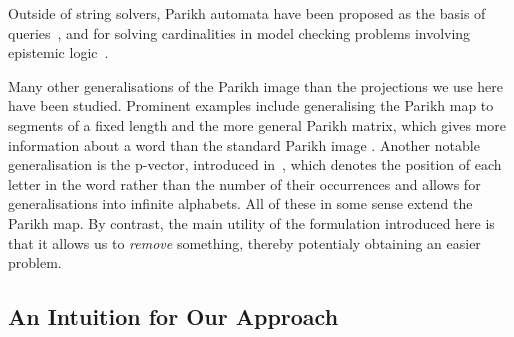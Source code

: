 Outside of string solvers, Parikh automata have been proposed as the basis of
queries~\cite{graph-queries}, and for solving cardinalities in model checking
problems involving epistemic logic~\cite{epistemic-logic}.

Many other generalisations of the Parikh image than the projections we use here have been
studied. Prominent examples include generalising the Parikh map to segments of a
fixed length \cite{KARHUMAKI1980155} and the more general Parikh matrix, which
gives more information about a word than the standard Parikh image
\cite{parikh-matrix}. Another notable generalisation is the p-vector, introduced
in~\cite{infinite-words}, which denotes the position of each letter in the word
rather than the number of their occurrences and allows for generalisations into
infinite alphabets. All of these in some sense extend the Parikh map. By
contrast, the main utility of the formulation introduced here is that it allows
us to \emph{remove} something, thereby potentialy obtaining an easier problem.

\subsection{An Intuition for Our Approach}\label{sec:intuition}

